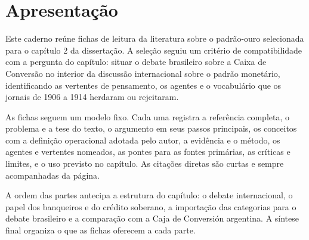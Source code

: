 \chapter*{Apresentação}

Este caderno reúne fichas de leitura da literatura sobre o padrão-ouro selecionada para o capítulo 2 da dissertação. A seleção seguiu um critério de compatibilidade com a pergunta do capítulo: situar o debate brasileiro sobre a Caixa de Conversão no interior da discussão internacional sobre o padrão monetário, identificando as vertentes de pensamento, os agentes e o vocabulário que os jornais de 1906 a 1914 herdaram ou rejeitaram.

As fichas seguem um modelo fixo. Cada uma registra a referência completa, o problema e a tese do texto, o argumento em seus passos principais, os conceitos com a definição operacional adotada pelo autor, a evidência e o método, os agentes e vertentes nomeados, as pontes para as fontes primárias, as críticas e limites, e o uso previsto no capítulo. As citações diretas são curtas e sempre acompanhadas da página.

A ordem das partes antecipa a estrutura do capítulo: o debate internacional, o papel dos banqueiros e do crédito soberano, a importação das categorias para o debate brasileiro e a comparação com a Caja de Conversión argentina. A síntese final organiza o que as fichas oferecem a cada parte.
